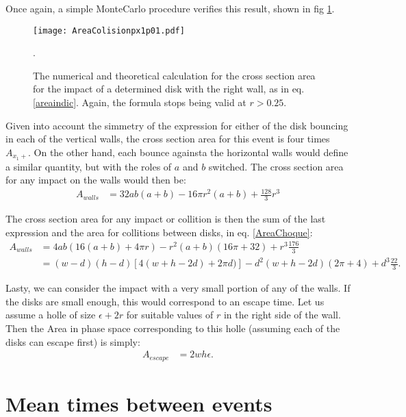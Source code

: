 \documentclass[a4paper,10pt, jcp, aps, preprint]{revtex4-1}
\begin{document}
Once again, a simple MonteCarlo procedure verifies this result,
shown in fig \ref{area1derecha}. 


\begin{figure}
\centering
\texttt{[image: AreaColisionpx1p01.pdf]}
\caption{The numerical and theoretical calculation for the cross section area
for the impact of a determined disk with the right wall, as in eq. \ref{areaindic}.
Again, the formula stops being valid at $r>0.25$. }
\label{area1derecha}.
\end{figure}


Given into account the simmetry of the expression for either of 
the disk bouncing in each of the vertical walls, the
cross section area for this event is four times $A_{x_1+}$. On
the other hand, each bounce againsta the horizontal walls would
define a similar quantity, but with the roles of $a$ and $b$ switched.
The cross section area for any impact on the walls would then be:
\begin{align}\label{areawalls}
 A_{walls} & = 32 a b (a+b)-16 \pi r^2 (a+b) +\frac{128}{3}r^3 
\end{align}

The cross section area for any impact or collition 
is then  the sum of the last expression
and the area for collitions between disks, in eq. \ref{AreaChoque}:
\begin{align}\label{areatotal}
 A_{walls} &= 4 a b (16(a+b) + 4\pi r)-r^2 (a+b)(16\pi+32)+r^3\frac{176}{3} \\ 
& = (w-d)(h-d)[4(w+h-2d)+2\pi d)]-d^2(w+h-2d)(2\pi+4)+d^3 \frac{22}{3}.
\end{align}

Lasty, we can consider the impact with a very small portion of any of the
walls. If the disks are small enough, this would correspond to an escape time. 
Let us assume a holle of size $\epsilon+2r$ for suitable values of $r$ in
the right side of the wall. Then the Area in phase space corresponding
to this holle (assuming each of the disks can escape first) is simply:
\begin{align}\label{escape}
 A_{escape} &= 2 w h \epsilon.
\end{align}



\section{Mean times between events}
\end{document}
